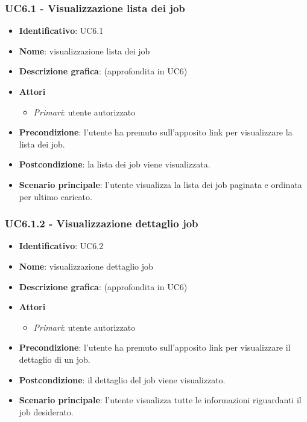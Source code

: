 \subsubsection{UC6.1 - Visualizzazione lista dei job}
\begin{itemize}
  \item \textbf{Identificativo}: UC6.1
  \item \textbf{Nome}: visualizzazione lista dei job
  \item \textbf{Descrizione grafica}: (approfondita in UC6)
  \item \textbf{Attori}
        \begin{itemize}
          \item \textit{Primari}: utente autorizzato
        \end{itemize}
  \item \textbf{Precondizione}: l'utente ha premuto sull'apposito link per visualizzare la lista dei job.
  \item \textbf{Postcondizione}: la lista dei job viene visualizzata.
  \item \textbf{Scenario principale}: l'utente visualizza la lista dei job paginata e ordinata per ultimo caricato.
\end{itemize}

\subsubsection{UC6.1.2 - Visualizzazione dettaglio job}
\begin{itemize}
  \item \textbf{Identificativo}: UC6.2
  \item \textbf{Nome}: visualizzazione dettaglio job
  \item \textbf{Descrizione grafica}: (approfondita in UC6)
  \item \textbf{Attori}
        \begin{itemize}
          \item \textit{Primari}: utente autorizzato
        \end{itemize}
  \item \textbf{Precondizione}: l'utente ha premuto sull'apposito link per visualizzare il dettaglio di un job.
  \item \textbf{Postcondizione}: il dettaglio del job viene visualizzato.
  \item \textbf{Scenario principale}: l'utente visualizza tutte le informazioni riguardanti il job desiderato.
\end{itemize}
\newpage